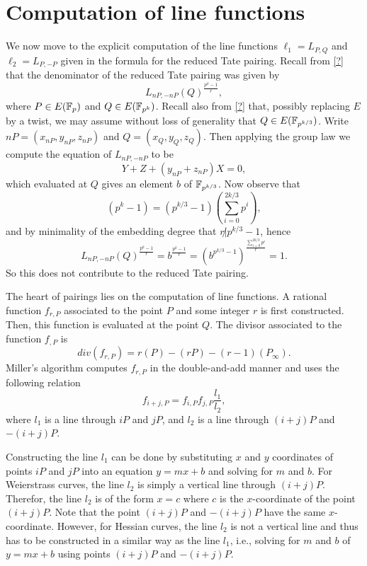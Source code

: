 \section{Computation of line functions}
\label{sec:formulas}

We now move to the explicit computation of the line functions
$\ell_{1} = L_{P,Q}$ and $\ell_{2} = L_{P,-P}$
given in the formula for the reduced Tate pairing.
Recall from \ref{?} that the denominator of the reduced Tate pairing was given by	%
\[L_{nP,-nP}(Q)^{\frac{p^{k}-1}{r}},\]
where $P \in E(\mathbb{F}_{p})$ and $Q \in E(\mathbb{F}_{p^{k}})$.
Recall also from \ref{?} that, possibly replacing $E$ by a twist,			%
we may assume without loss of generality that $Q \in E(\mathbb{F}_{p^{k/3}})$.
Write $nP = (x_{nP},y_{nP},z_{nP})$ and $Q=(x_{Q},y_{Q},z_{Q})$.
Then applying the group law we compute the equation of $L_{nP,-nP}$ to be
\[Y + Z + (y_{nP} + z_{nP})X = 0,\] which evaluated at $Q$ gives an element $b$ of $\mathbb{F}_{p^{k/3}}$.
Now observe that
\[(p^{k} -1) = (p^{k/3}-1)(\sum_{i=0}^{2k/3} p^{i}),\]
and by minimality of the embedding degree that $r \not | p^{k/3}-1$,
hence
\[L_{nP,-nP}(Q)^{\frac{p^{k}-1}{r}} = b^{\frac{p^{k}-1}{r}} = (b^{p^{k/3}-1})^\frac{\sum_{i=0}^{2k/3} p^{i}}{r} = 1.\]
So this does not contribute to the reduced Tate pairing.

The heart of pairings lies on the computation of line functions.
A rational function $f_{r,P}$ associated to the point $P$ and some integer $r$
is first constructed.
Then, this function is evaluated at the point $Q$.
The divisor associated to the function $f_{,P}$ is
$$ div(f_{r,P}) = r(P) - (rP) - (r-1)(P_\infty). $$
Miller's algorithm computes $f_{r,P}$ in the double-and-add manner
and uses the following relation
$$ f_{i+j,P} = f_{i,P} f_{j,P} \frac{l_1}{l_2}, $$
where $l_1$ is a line through $iP$ and $jP$,
and $l_2$ is a line through $(i+j)P$ and $-(i+j)P$.

Constructing the line $l_1$ can be done by substituting $x$ and $y$ coordinates of points $iP$ and $jP$
into an equation $y = mx + b$ and solving for $m$ and $b$.
For Weierstrass curves, the line $l_2$ is simply a vertical line through $(i+j)P$.
Therefor, the line $l_2$ is of the form $x = c$ where $c$ is the $x$-coordinate of the point $(i+j)P$.
Note that the point $(i+j)P$ and $-(i+j)P$ have the same $x$-coordinate.
However, for Hessian curves, the line $l_2$ is not a vertical line
and thus has to be constructed in a similar way as the line $l_1$,
i.e., solving for $m$ and $b$ of $y = mx + b$ using points $(i+j)P$ and $-(i+j)P$.

